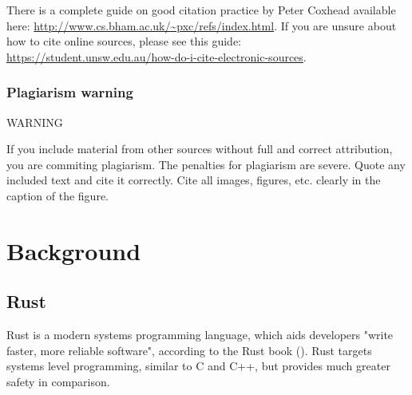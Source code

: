 \documentclass{l4proj}
\begin{document}


There is a complete guide on good citation practice by Peter Coxhead available here: \url{http://www.cs.bham.ac.uk/~pxc/refs/index.html}. 
If you are unsure about how to cite online sources, please see this guide: \url{https://student.unsw.edu.au/how-do-i-cite-electronic-sources}.

\subsection{Plagiarism warning}

\begin{highlight_title}{WARNING}
    
    If you include material from other sources without full and correct attribution, you are commiting plagiarism. The penalties for plagiarism are severe.
    Quote any included text and cite it correctly. Cite all images, figures, etc. clearly in the caption of the figure.
\end{highlight_title}


\chapter{Background}

\section{Rust}

Rust is a modern systems programming language, which aids developers "write faster, more reliable software", according to the Rust book
(\cite{kalbnikRustProgrammingLanguagen.d.}).
Rust targets systems level programming, similar to C and C++, but provides much greater safety in comparison.
\end{document}
